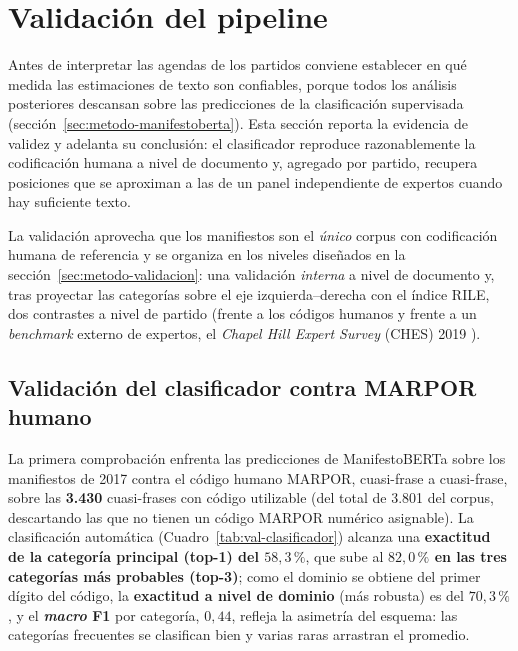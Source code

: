 \section{Validación del pipeline}
\label{sec:res-validacion}

Antes de interpretar las agendas de los partidos conviene establecer en qué
medida las estimaciones de texto son confiables, porque todos los análisis
posteriores descansan sobre las predicciones de la clasificación supervisada
(sección~\ref{sec:metodo-manifestoberta}). Esta sección reporta la evidencia de
validez y adelanta su conclusión: el clasificador reproduce razonablemente la
codificación humana a nivel de documento y, agregado por partido, recupera
posiciones que se aproximan a las de un panel independiente de expertos cuando
hay suficiente texto.

La validación aprovecha que los manifiestos son el \emph{único} corpus con
codificación humana de referencia y se organiza en los niveles diseñados en la
sección~\ref{sec:metodo-validacion}: una validación \emph{interna} a nivel de
documento y, tras proyectar las categorías sobre el eje izquierda--derecha con el
índice RILE, dos contrastes a nivel de partido (frente a los códigos humanos y
frente a un \emph{benchmark} externo de expertos, el \emph{Chapel Hill Expert
Survey} (CHES) 2019 \cite{jolly2022ches, ches2019data}).

\subsection{Validación del clasificador contra MARPOR humano}
\label{sec:res-val-clasificador}

La primera comprobación enfrenta las predicciones de ManifestoBERTa
\cite{manifestoberta2024} sobre los manifiestos de 2017 contra el código humano
MARPOR, cuasi-frase a cuasi-frase, sobre las \textbf{3.430} cuasi-frases con
código utilizable (del total de 3.801 del corpus, descartando las que no tienen
un código MARPOR numérico asignable). La clasificación automática
(Cuadro~\ref{tab:val-clasificador}) alcanza una \textbf{exactitud de la categoría
principal (top-1) del $58{,}3\,\%$}, que sube al \textbf{$82{,}0\,\%$ en las tres
categorías más probables (top-3)}; como el dominio se obtiene del primer dígito
del código, la \textbf{exactitud a nivel de dominio} (más robusta) es del
\textbf{$70{,}3\,\%$}, y el \textbf{\emph{macro} F1} por categoría, $0{,}44$,
refleja la asimetría del esquema: las categorías frecuentes se clasifican bien y
varias raras arrastran el promedio.

